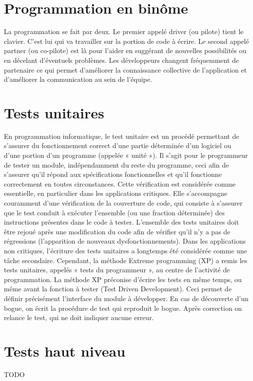 \section{Programmation en binôme}\label{lexique:pairProgramming}
La programmation se fait par deux. Le premier appelé driver (ou pilote) tient le clavier. C'est lui qui va travailler sur la portion de code à écrire. Le second appelé partner (ou co-pilote) est là pour l'aider en suggérant de nouvelles possibilités ou en décelant d'éventuels problèmes. Les développeurs changent fréquemment de partenaire ce qui permet d'améliorer la connaissance collective de l'application et d'améliorer la communication au sein de l'équipe. 

\section{Tests unitaires}\label{lexique:testU}
En programmation informatique, le test unitaire est un procédé permettant de s'assurer du fonctionnement correct d'une partie déterminée d'un logiciel ou d'une portion d'un programme (appelée « unité »). Il s'agit pour le programmeur de tester un module, indépendamment du reste du programme, ceci afin de s'assurer qu'il répond aux spécifications fonctionnelles et qu'il fonctionne correctement en toutes circonstances. Cette vérification est considérée comme essentielle, en particulier dans les applications critiques. Elle s'accompagne couramment d'une vérification de la couverture de code, qui consiste à s'assurer que le test conduit à exécuter l'ensemble (ou une fraction déterminée) des instructions présentes dans le code à tester. L'ensemble des tests unitaires doit être rejoué après une modification du code afin de vérifier qu'il n'y a pas de régressions (l'apparition de nouveaux dysfonctionnements). Dans les applications non critiques, l'écriture des tests unitaires a longtemps été considérée comme une tâche secondaire. Cependant, la méthode Extreme programming (XP) a remis les tests unitaires, appelés « tests du programmeur », au centre de l'activité de programmation. La méthode XP préconise d'écrire les tests en même temps, ou même avant la fonction à tester (Test Driven Development). Ceci permet de définir précisément l'interface du module à développer. En cas de découverte d'un bogue, on écrit la procédure de test qui reproduit le bogue. Après correction on relance le test, qui ne doit indiquer aucune erreur.

\section{Tests haut niveau}\label{testHL}
TODO



